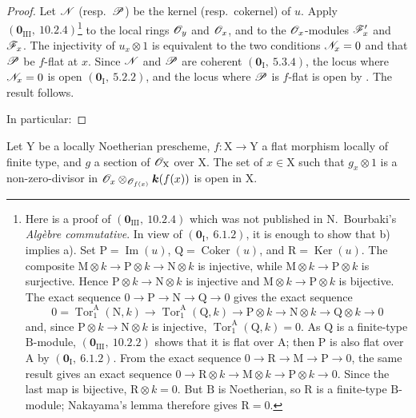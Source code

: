 \begin{proof}
Let $\mathscr{N}$ (resp.\ $\mathscr{P}$) be the kernel (resp.\ cokernel) of $u$.
Apply $(\mathbf{0}_{\mathrm{III}},~10.2.4)$\footnote{Here is a proof of
$(\mathbf{0}_{\mathrm{III}},~10.2.4)$ which was not published in
N.~Bourbaki's \emph{Alg\`ebre commutative}. In view of
$(\mathbf{0}_\mathrm{I},~6.1.2)$, it is enough to show that b) implies a).
Set $\mathrm{P}=\operatorname{Im}(u)$,
$\mathrm{Q}=\operatorname{Coker}(u)$, and
$\mathrm{R}=\operatorname{Ker}(u)$. The composite
$\mathrm{M}\otimes k\to\mathrm{P}\otimes k\to\mathrm{N}\otimes k$ is
injective, while $\mathrm{M}\otimes k\to\mathrm{P}\otimes k$ is
surjective. Hence $\mathrm{P}\otimes k\to\mathrm{N}\otimes k$ is
injective and $\mathrm{M}\otimes k\to\mathrm{P}\otimes k$ is bijective.
The exact sequence $0\to\mathrm{P}\to\mathrm{N}\to\mathrm{Q}\to0$ gives
the exact sequence
\[
0=\operatorname{Tor}_1^\mathrm{A}(\mathrm{N},k)\to\operatorname{Tor}_1^\mathrm{A}(\mathrm{Q},k)\to\mathrm{P}\otimes k\to\mathrm{N}\otimes k\to\mathrm{Q}\otimes k\to 0
\]
and, since $\mathrm{P}\otimes k\to\mathrm{N}\otimes k$ is injective,
$\operatorname{Tor}_1^\mathrm{A}(\mathrm{Q},k)=0$. As $\mathrm{Q}$ is a
finite-type $\mathrm{B}$-module,
$(\mathbf{0}_{\mathrm{III}},~10.2.2)$ shows that it is flat over
$\mathrm{A}$; then $\mathrm{P}$ is also flat over $\mathrm{A}$ by
$(\mathbf{0}_\mathrm{I},~6.1.2)$. From the exact sequence
$0\to\mathrm{R}\to\mathrm{M}\to\mathrm{P}\to0$, the same result gives an
exact sequence
$0\to\mathrm{R}\otimes k\to\mathrm{M}\otimes k\to
\mathrm{P}\otimes k\to0$. Since the last map is bijective,
$\mathrm{R}\otimes k=0$. But $\mathrm{B}$ is Noetherian, so
$\mathrm{R}$ is a finite-type $\mathrm{B}$-module; Nakayama's lemma
therefore gives $\mathrm{R}=0$.}
to the local rings $\mathscr{O}_y$ and $\mathscr{O}_x$, and to the
$\mathscr{O}_x$-modules $\mathscr{F}'_x$ and $\mathscr{F}_x$. The injectivity of
$u_x\otimes1$ is equivalent to the two conditions
$\mathscr{N}_x=0$ and that $\mathscr{P}$ be $f$-flat at $x$. Since
$\mathscr{N}$ and $\mathscr{P}$ are coherent $(\mathbf{0}_\mathrm{I},~5.3.4)$,
the locus where $\mathscr{N}_x=0$ is open
$(\mathbf{0}_\mathrm{I},~5.2.2)$, and the locus where $\mathscr{P}$ is
$f$-flat is open by . The result follows.

In particular:
\end{proof}

\begin{corollary}[11.1.3]
\label{IV.11.1.3}
Let $\mathrm{Y}$ be a locally Noetherian prescheme,
$f:\mathrm{X}\to\mathrm{Y}$ a flat morphism locally of finite type, and
$g$ a section of $\mathscr{O}_\mathrm{X}$ over $\mathrm{X}$. The set of
$x\in\mathrm{X}$ such that $g_x\otimes 1$ is a non-zero-divisor in
$\mathscr{O}_x\otimes_{\mathscr{O}_{f(x)}}\boldsymbol{k}(f(x))$ is open in
$\mathrm{X}$.
\end{corollary}


